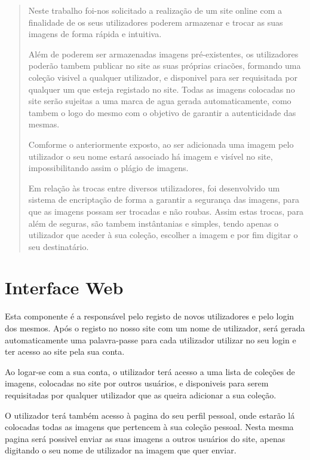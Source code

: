 \documentclass{report}
\begin{document}
\renewcommand{\abstractname}{OBJETIVOS DO PROJETO}
\begin{abstract}

Neste trabalho foi-nos solicitado a realização de um site online com a finalidade de os seus utilizadores poderem armazenar e trocar as suas imagens de forma rápida e intuitiva. 

Além de poderem ser armazenadas imagens pré-existentes, os utilizadores poderão tambem publicar no site as suas próprias criacões, formando uma coleção visivel a qualquer utilizador, e disponivel para ser requisitada por qualquer um que esteja registado no site.
Todas as imagens colocadas no site serão sujeitas a uma marca de agua gerada automaticamente, como tambem o logo do mesmo com o objetivo de garantir a autenticidade das mesmas.

Comforme o anteriormente exposto, ao ser adicionada uma imagem pelo utilizador o seu nome estará associado há imagem e visível no site, impossibilitando assim o plágio de imagens.

Em relação às trocas entre diversos utilizadores, foi desenvolvido um sistema de encriptação de forma a garantir a segurança das imagens, para que as imagens possam ser trocadas e não roubas. Assim estas trocas, para além de seguras, são tambem instântanias e simples, tendo apenas o utilizador que aceder à sua coleção, escolher a imagem e por fim digitar o seu destinatário.

\end{abstract}


\section{Interface Web}
Esta componente é a responsável pelo registo de novos utilizadores e pelo login dos mesmos. Após o registo no nosso site com um nome de utilizador, será gerada automaticamente uma palavra-passe para cada utilizador utilizar no seu login e ter acesso ao site pela sua conta.

Ao logar-se com a sua conta, o utilizador terá acesso a uma lista de coleções de imagens, colocadas no site por outros usuários, e disponiveis para serem requisitadas por qualquer utilizador que as queira adicionar a sua coleção. 

O utilizador terá também acesso à pagina do seu perfil pessoal, onde estarão lá colocadas todas as imagens que pertencem à sua coleção pessoal. Nesta mesma pagina será possivel enviar as suas imagens a outros usuários do site, apenas digitando o seu nome de utilizador na imagem que quer enviar. 
\end{document}
